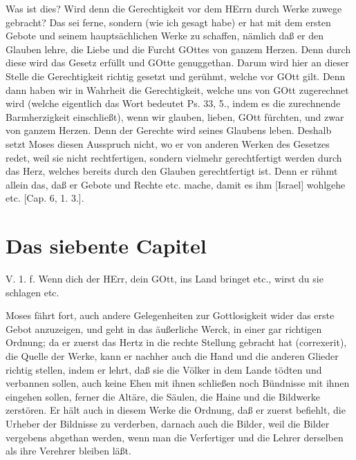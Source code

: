 Was ist dies? Wird denn die Gerechtigkeit vor dem HErrn durch Werke zuwege gebracht? Das sei ferne, sondern (wie ich gesagt habe) er hat mit dem ersten Gebote und seinem hauptsächlichen Werke zu schaffen, nämlich daß er den Glauben lehre, die Liebe und die Furcht GOttes von ganzem Herzen. Denn durch diese wird das Gesetz erfüllt und GOtte genuggethan. Darum wird hier an dieser Stelle die Gerechtigkeit richtig gesetzt und gerühmt, welche vor GOtt gilt. Denn dann haben wir in Wahrheit die Gerechtigkeit, welche uns von GOtt zugerechnet wird (welche eigentlich das Wort  bedeutet Ps. 33, 5., indem es die zurechnende Barmherzigkeit einschließt), wenn wir glauben, lieben, GOtt fürchten, und zwar von ganzem Herzen. Denn der Gerechte wird seines Glaubens leben. Deshalb setzt Moses diesen Ausspruch nicht, wo er von anderen Werken des Gesetzes redet, weil sie nicht rechtfertigen, sondern vielmehr gerechtfertigt werden durch das Herz, welches bereits durch den Glauben gerechtfertigt ist. Denn er rühmt allein das, daß er Gebote und Rechte etc. mache, damit es ihm [Israel] wohlgehe etc. [Cap. 6, 1. 3.].

\section{Das siebente Capitel}

\begin{schriftzitat}
V. 1. f. Wenn dich der HErr, dein GOtt, ins Land bringet etc., wirst du sie schlagen etc.
\end{schriftzitat}

Moses fährt fort, auch andere Gelegenheiten zur Gottlosigkeit wider das erste Gebot anzuzeigen, und geht in das äußerliche Werck, in einer gar richtigen Ordnung; da er zuerst das Hertz in die rechte Stellung gebracht hat (correxerit), die Quelle der Werke, kann er nachher auch die Hand und die anderen Glieder richtig stellen, indem er lehrt, daß sie die Völker in dem Lande tödten und verbannen sollen, auch keine Ehen mit ihnen schließen noch Bündnisse mit ihnen eingehen sollen, ferner die Altäre, die Säulen, die Haine und die Bildwerke zerstören. Er hält auch in diesem Werke die Ordnung, daß er zuerst befiehlt, die Urheber der Bildnisse zu verderben, darnach auch die Bilder, weil die Bilder vergebens abgethan werden, wenn man die Verfertiger und die Lehrer derselben als ihre Verehrer bleiben läßt.

